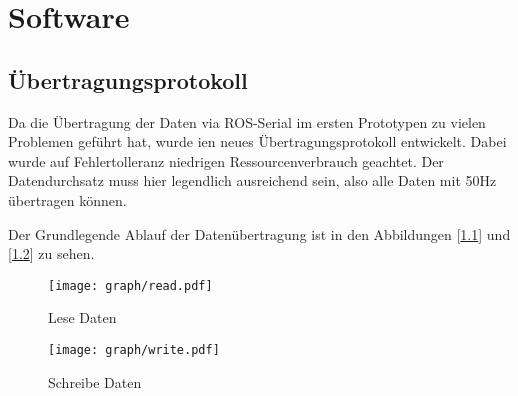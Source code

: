 \chapter{Software}

\section{Übertragungsprotokoll}
Da die Übertragung der Daten via ROS-Serial im ersten Prototypen zu vielen Problemen geführt hat, wurde ien neues Übertragungsprotokoll entwickelt.
Dabei wurde auf Fehlertolleranz niedrigen Ressourcenverbrauch geachtet. Der Datendurchsatz muss hier legendlich ausreichend sein, also alle Daten mit 50Hz
übertragen können.

Der Grundlegende Ablauf der Datenübertragung ist in den Abbildungen [\ref{fig:uC_read}] und [\ref{fig:uC_write}] zu sehen.



\begin{figure}[ht]
\centering
\texttt{[image: graph/read.pdf]} 
\caption{Lese Daten}
\label{fig:uC_read}
\end{figure}


\begin{figure}[ht]
\centering
\texttt{[image: graph/write.pdf]} 
\caption{Schreibe Daten}
\label{fig:uC_write}
\end{figure}